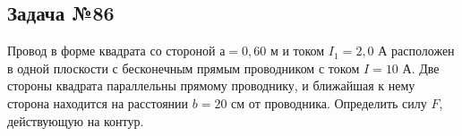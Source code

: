 \subsection{Задача №86}

Провод в форме квадрата со стороной $а = 0,60$ м и током $I_1 = 2,0$ А расположен в одной плоскости с бесконечным прямым проводником с током $I = 10$ А. Две стороны квадрата параллельны прямому проводнику, и ближайшая к нему сторона находится на расстоянии $b = 20$ см от проводника. Определить силу $F$, действующую на контур.
